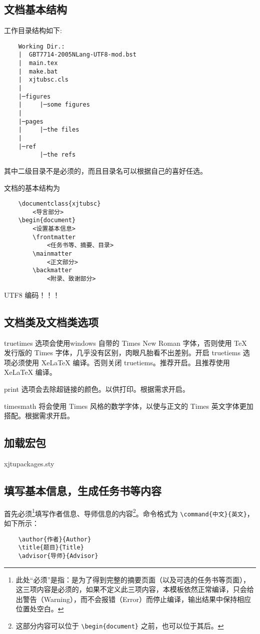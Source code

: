 \documentclass[%
               print, 
               timesmath
              ]{xjtubsc}
\begin{document}
\subsection{文档基本结构}
工作目录结构如下:
\begin{verbatim}
    Working Dir.:
    |  GBT7714-2005NLang-UTF8-mod.bst
    |  main.tex
    |  make.bat
    |  xjtubsc.cls
    |
    |─figures
    |     |─some figures
    |
    |─pages
    |     |─the files
    |
    |─ref
          |─the refs
\end{verbatim}
其中二级目录不是必须的，而且目录名可以根据自己的喜好任选。

文档的基本结构为
\begin{verbatim}
    \documentclass{xjtubsc}
        <导言部分>
    \begin{document}
        <设置基本信息>
        \frontmatter  
            <任务书等、摘要、目录>
        \mainmatter
            <正文部分>
        \backmatter
            <附录、致谢部分>
\end{verbatim}

UTF8 编码！！！
\subsection{文档类及文档类选项}

truetimes 选项会使用windows 自带的 Times New Roman 字体，否则使用 TeX 发行版的 Times 字体，几乎没有区别，肉眼凡胎看不出差别。开启 truetiems 选项必须使用 XeLaTeX 编译。否则关闭 truetiems。推荐开启。且推荐使用 XeLaTeX 编译。

print 选项会去除超链接的颜色。以供打印。根据需求开启。

timesmath 将会使用 Times 风格的数学字体，以使与正文的 Times 英文字体更加搭配。根据需求开启。

\subsection{加载宏包}
xjtupackages.sty

\subsection{填写基本信息，生成任务书等内容}

首先必须\footnote{此处“必须”是指：是为了得到完整的摘要页面（以及可选的任务书等页面），这三项内容是必须的，如果不定义此三项内容，本模板依然正常编译，只会给出警告（Warning），而不会报错（Error）而停止编译，输出结果中保持相应位置处空白。}填写作者信息、导师信息的内容\footnote{这部分内容可以位于 \verb+\begin{document}+ 之前，也可以位于其后。}。命令格式为 \verb|\command{中文}{英文}|，如下所示：
\begin{verbatim}
    \author{作者}{Author}
    \title{题目}{Title}
    \advisor{导师}{Advisor}
\end{verbatim}
\end{document}

